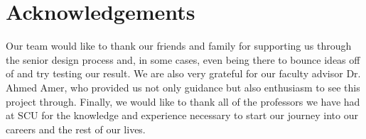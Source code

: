 \section*{Acknowledgements}
Our team would like to thank our friends and family for supporting us through the senior design process and, in some cases, even being there to bounce ideas off of and try testing our result.  We are also very grateful for our faculty advisor Dr. Ahmed Amer, who provided us not only guidance but also enthusiasm to see this project through.  Finally, we would like to thank all of the professors we have had at SCU for the knowledge and experience necessary to start our journey into our careers and the rest of our lives.